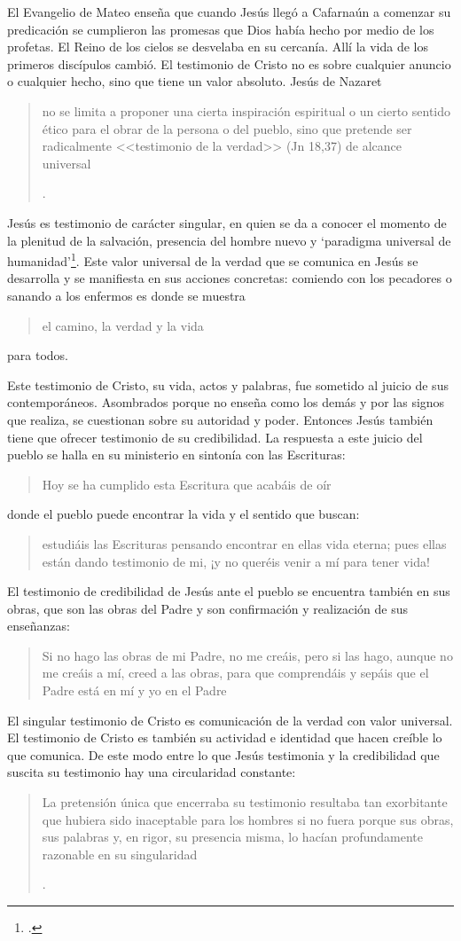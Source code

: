 El Evangelio de Mateo enseña que cuando Jesús llegó a Cafarnaún a comenzar su predicación se cumplieron las promesas que Dios había hecho por medio de los profetas. El Reino de los cielos se desvelaba en su cercanía. Allí la vida de los primeros discípulos cambió. El testimonio de Cristo no es sobre cualquier anuncio o cualquier hecho, sino que tiene un valor absoluto. Jesús de Nazaret \blockquote[{\Cite[126]{prades2015testimonio}}.]{no se limita a proponer una cierta inspiración espiritual o un cierto sentido ético para el obrar de la persona o del pueblo, sino que pretende ser radicalmente <<testimonio de la verdad>> (Jn 18,37) de alcance universal}.

Jesús es testimonio de carácter singular, en quien se da a conocer el momento de la plenitud de la salvación, presencia del hombre nuevo y `paradigma universal de humanidad'\footcite[Cf.][279; 290-291]{ninot2009tf}. Este valor universal de la verdad que se comunica en Jesús se desarrolla y se manifiesta en sus acciones concretas: comiendo con los pecadores o sanando a los enfermos es donde se muestra \blockquote[][\,(Cf. Jn 14,6)]{el camino, la verdad y la vida} para todos.

Este testimonio de Cristo, su vida, actos y palabras, fue sometido al juicio de sus contemporáneos. Asombrados porque no enseña como los demás y por las signos que realiza, se cuestionan sobre su autoridad y poder. Entonces Jesús también tiene que ofrecer testimonio de su credibilidad. La respuesta a este juicio del pueblo se halla en su ministerio en sintonía con las Escrituras: \blockquote[][\,(Lc 4,21)]{Hoy se ha cumplido esta Escritura que acabáis de oír}; donde el pueblo puede encontrar la vida y el sentido que buscan: \blockquote[][\,(Jn 5,39-40)]{estudiáis las Escrituras pensando encontrar en ellas vida eterna; pues ellas están dando testimonio de mi, ¡y no queréis venir a mí para tener vida!}. El testimonio de credibilidad de Jesús ante el pueblo se encuentra también en sus obras, que son las obras del Padre y son confirmación y realización de sus enseñanzas: \blockquote[][\,(Jn 10,38)]{Si no hago las obras de mi Padre, no me creáis, pero si las hago, aunque no me creáis a mí, creed a las obras, para que comprendáis y sepáis que el Padre está en mí y yo en el Padre}.

El singular testimonio de Cristo es comunicación de la verdad con valor universal. El testimonio de Cristo es también su actividad e identidad que hacen creíble lo que comunica. De este modo entre lo que Jesús testimonia y la credibilidad que suscita su testimonio hay una circularidad constante: \blockquote[{\Cite[124]{prades2015testimonio}}.]{La pretensión única que encerraba su testimonio resultaba tan exorbitante que hubiera sido inaceptable para los hombres si no fuera porque sus obras, sus palabras y, en rigor, su presencia misma, lo hacían profundamente razonable en su singularidad}.

